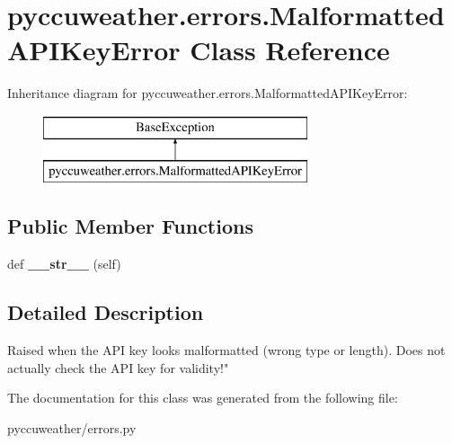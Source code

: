 \hypertarget{classpyccuweather_1_1errors_1_1_malformatted_a_p_i_key_error}{}\section{pyccuweather.\+errors.\+Malformatted\+A\+P\+I\+Key\+Error Class Reference}
\label{classpyccuweather_1_1errors_1_1_malformatted_a_p_i_key_error}
Inheritance diagram for pyccuweather.\+errors.\+Malformatted\+A\+P\+I\+Key\+Error\+:\begin{figure}[H]
\begin{center}
\leavevmode
\includegraphics[height=2.000000cm]{classpyccuweather_1_1errors_1_1_malformatted_a_p_i_key_error}
\end{center}
\end{figure}
\subsection*{Public Member Functions}
\begin{DoxyCompactItemize}
\item 
\hypertarget{classpyccuweather_1_1errors_1_1_malformatted_a_p_i_key_error_a1820a7856806a94b1dceae84bb00f8fd}{}def {\bfseries \+\_\+\+\_\+str\+\_\+\+\_\+} (self)\label{classpyccuweather_1_1errors_1_1_malformatted_a_p_i_key_error_a1820a7856806a94b1dceae84bb00f8fd}

\end{DoxyCompactItemize}


\subsection{Detailed Description}
\begin{DoxyVerb}Raised when the API key looks malformatted (wrong type or length). Does not actually check the API key for validity!"
\end{DoxyVerb}
 

The documentation for this class was generated from the following file\+:\begin{DoxyCompactItemize}
\item 
pyccuweather/errors.\+py\end{DoxyCompactItemize}
